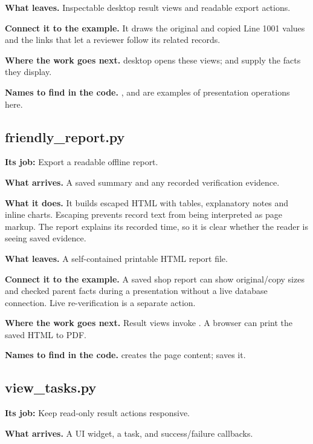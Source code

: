 \textbf{What leaves.} Inspectable desktop result views and readable export actions.

\textbf{Connect it to the example.} It draws the original and copied Line 1001 values and the links that let a reviewer follow its related records.

\textbf{Where the work goes next.} desktop opens these views;  and  supply the facts they display.

\textbf{Names to find in the code.} ,  and  are examples of presentation operations here.


\subsection{friendly\_report.py}

\textbf{Its job:} Export a readable offline report.

\textbf{What arrives.} A saved summary and any recorded verification evidence.

\textbf{What it does.} It builds escaped HTML with tables, explanatory notes and inline charts. Escaping prevents record text from being interpreted as page markup. The report explains its recorded time, so it is clear whether the reader is seeing saved evidence.

\textbf{What leaves.} A self-contained printable HTML report file.

\textbf{Connect it to the example.} A saved shop report can show original/copy sizes and checked parent facts during a presentation without a live database connection. Live re-verification is a separate action.

\textbf{Where the work goes next.} Result views invoke . A browser can print the saved HTML to PDF.

\textbf{Names to find in the code.}  creates the page content;  saves it.


\subsection{view\_tasks.py}

\textbf{Its job:} Keep read-only result actions responsive.

\textbf{What arrives.} A UI widget, a task, and success/failure callbacks.


